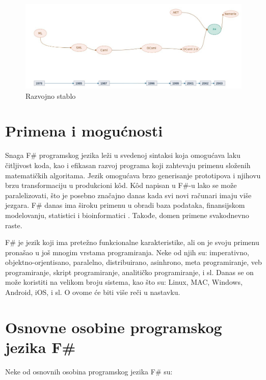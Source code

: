 \documentclass[a4paper]{article}
\begin{document}
\begin{figure}[h!]
\begin{center}
\includegraphics[scale=0.255]{stablo.jpg}
\end{center}
\caption{Razvojno stablo}
\label{fig:stablo}
\end{figure}

\section{Primena i mogućnosti}
\label{sec:primena}

Snaga F\# programskog jezika leži u svedenoj sintaksi koja omogućava laku čitljivost koda, kao i efikasan razvoj programa koji zahtevaju primenu složenih matematičkih algoritama. Jezik omogućava brzo generisanje prototipova i njihovu brzu transformaciju u produkcioni kôd. Kôd napisan u F\#-u lako se može paralelizovati, što je posebno značajno danas kada svi novi računari imaju više jezgara. F\# danas ima široku primenu u obradi baza podataka, finansijskom modelovanju, statistici i bioinformatici \cite{primena}. Takođe, domen primene svakodnevno raste.

F\# je jezik koji ima pretežno funkcionalne karakteristike, ali on je svoju primenu pronašao u još mnogim vrstama programiranja. Neke od njih su: imperativno, objektno-orjentisano, paralelno, distribuirano, asinhrono, meta programiranje, veb programiranje, skript programiranje, analitičko programiranje, i sl. Danas se on može koristiti na velikom broju sistema, kao što su: Linux, MAC, Windows, Android, iOS, i sl. O ovome će biti više reči u nastavku. 


\section{Osnovne osobine programskog jezika F\#}

Neke od osnovnih osobina programskog jezika F\# su:\\
\end{document}
